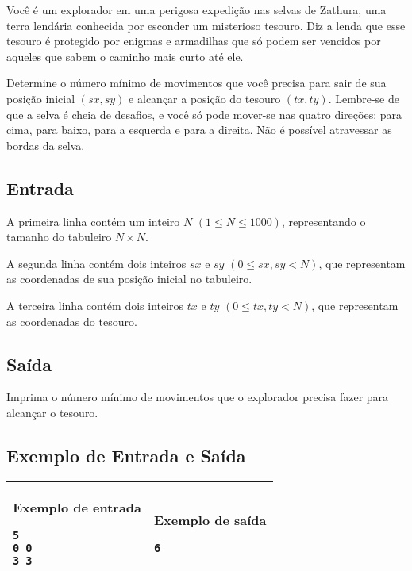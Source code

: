 Você é um explorador em uma perigosa expedição nas selvas de Zathura, uma terra lendária conhecida por esconder um misterioso tesouro. 
Diz a lenda que esse tesouro é protegido por enigmas e armadilhas que só podem ser vencidos por aqueles que sabem o caminho mais curto até ele.

Determine o número mínimo de movimentos que você precisa para sair de sua posição inicial \((sx, sy)\) e alcançar a posição do tesouro \((tx, ty)\). 
Lembre-se de que a selva é cheia de desafios, e você só pode mover-se nas quatro direções: para cima, para baixo, para a esquerda e para a direita. 
Não é possível atravessar as bordas da selva.

\subsection*{Entrada}
A primeira linha contém um inteiro \(N\) \((1 \leq N \leq 1000)\), representando o tamanho do tabuleiro \(N \times N\).

A segunda linha contém dois inteiros \(sx\) e \(sy\) \((0 \leq sx, sy < N)\), que representam as coordenadas de sua posição inicial no tabuleiro.

A terceira linha contém dois inteiros \(tx\) e \(ty\) \((0 \leq tx, ty < N)\), que representam as coordenadas do tesouro.

\subsection*{Saída}

Imprima o número mínimo de movimentos que o explorador precisa fazer para alcançar o tesouro.

\subsection*{Exemplo de Entrada e Saída}

\begin{table}[!h]  
\centering  
\begin{tabular}{|l|l|}  
\hline  
\begin{minipage}[t]{3in}  
\textbf{Exemplo de entrada}  
\begin{verbatim}  
5  
0 0  
3 3  
\end{verbatim}  
\vspace{1mm}
\end{minipage}  
&  
\begin{minipage}[t]{3in}  
\textbf{Exemplo de saída}  
\begin{verbatim}  
6  
\end{verbatim}  
\vspace{1mm}
\end{minipage} \\  
\hline  
\end{tabular}  
\end{table}

